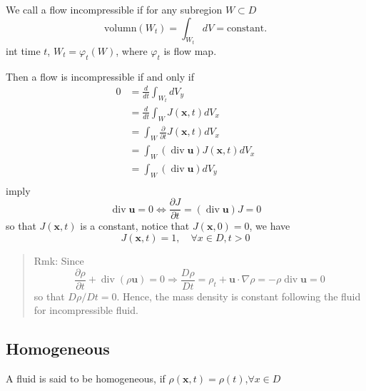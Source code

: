 We call a flow incompressible if for any subregion $W \subset D $
\begin{equation}
\text{volumn}(W_t) = \int_{W_t} dV = \text{constant.}
\end{equation}
int time $t$, $W_t = \varphi_t(W)$, where $\varphi_t$ is flow map.

Then a flow is incompressible if and only if
\begin{equation}
\begin{aligned}
0 &= \frac{d}{dt}\int_{W_t} dV_y\\
&= \frac{d}{dt} \int_{W} J(\textbf{x},t) dV_x\\
&= \int_{W} \frac{\partial}{\partial t} J(\textbf{x},t) dV_x\\
&= \int_{W} (\operatorname{div}\textbf{u})J(\textbf{x},t) dV_x\\
&= \int_{W} (\operatorname{div}\textbf{u})dV_y\\
\end{aligned}
\end{equation}
imply 
\begin{equation}
\operatorname{div}\textbf{u} = 0
\Leftrightarrow
\frac{\partial J}{\partial t} = (\operatorname{div}\textbf{u}) J = 0
\end{equation}
so that $J(\textbf{x},t)$ is a constant, notice that $J(\textbf{x},0) = 0$, we have
\begin{equation}
J(\textbf{x},t) = 1,\quad \forall x\in D, t>0
\end{equation}


\begin{quote}
	Rmk:
Since
\begin{equation}
\frac{\partial \rho}{\partial t} + \operatorname{div}(\rho \textbf{u}) = 0 \Rightarrow \frac{D\rho}{Dt} = \rho_t + \textbf{u}\cdot \nabla \rho = -\rho \operatorname{div}\textbf{u} = 0
\end{equation}
so that $D\rho/Dt = 0$. Hence, the mass density is constant following the fluid for incompressible fluid.
\end{quote}

\subsection{Homogeneous} %


A fluid is said to be homogeneous, if $\rho (\textbf{x},t) = \rho(t)$,$\forall x\in D$


